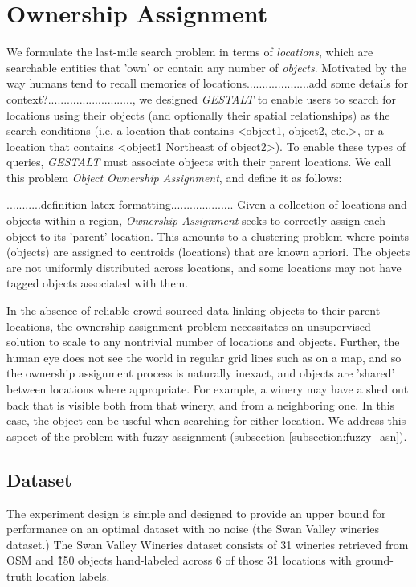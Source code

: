 \section{Ownership Assignment}
\label{section:ownership}


We formulate the last-mile search problem in terms of \textit{locations}, which are searchable entities that 'own' or contain any number of \textit{objects}. Motivated by the way humans tend to recall memories of locations....................add some details for context?..........................., we designed \emph{GESTALT} to enable users to search for locations using their objects (and optionally their spatial relationships) as the search conditions (i.e. a location that contains <object1, object2, etc.>, or a location that contains <object1 Northeast of object2>). To enable these types of queries, \emph{GESTALT} must associate objects with their parent locations.
We call this problem \textit{Object Ownership Assignment}, and define it as follows:

...........definition latex formatting.................... Given a collection of locations and objects within a region, \emph{Ownership Assignment} seeks to correctly assign each object to its 'parent' location. This amounts to a clustering problem where points (objects) are assigned to centroids (locations) that are known apriori. The objects are not uniformly distributed across locations, and some locations may not have tagged objects associated with them. 


In the absence of reliable crowd-sourced data linking objects to their parent locations, the ownership assignment problem necessitates an unsupervised solution to scale to any nontrivial number of locations and objects. Further, the human eye does not see the world in regular grid lines such as on a map, and so the ownership assignment process is naturally inexact, and objects are 'shared' between locations where appropriate. For example, a winery may have a shed out back that is visible both from that winery, and from a neighboring one. In this case, the object can be useful when searching for either location. We address this aspect of the problem with fuzzy assignment (subsection \ref{subsection:fuzzy_asn}).


\subsection{Dataset}
The experiment design is simple and designed to provide an upper bound for performance on an optimal dataset with no noise (the Swan Valley wineries dataset.) 
The Swan Valley Wineries dataset consists of 31 wineries retrieved from OSM and \~150 objects hand-labeled across 6 of those 31 locations with ground-truth location labels.



